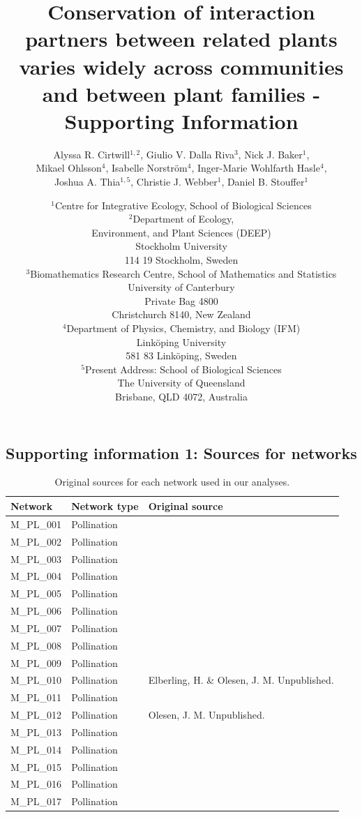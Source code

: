 \documentclass[12pt]{article}
\title{Conservation of interaction partners between related plants varies widely across communities and between plant families - Supporting Information}
\author{Alyssa R. Cirtwill$^{1,2}$, Giulio V. Dalla Riva$^{3}$, Nick J. Baker$^{1}$,\\
Mikael Ohlsson$^{4}$, Isabelle Norstr\"{o}m$^{4}$, Inger-Marie Wohlfarth Hasle$^{4}$,\\
Joshua A. Thia$^{1,5}$, Christie J. Webber$^{1}$, Daniel B. Stouffer$^{1}$}
\date{\small$^1$Centre for Integrative Ecology, School of Biological Sciences\\
\medskip$^2$Department of Ecology,\\
Environment, and Plant Sciences (DEEP)\\
Stockholm University\\
114 19 Stockholm, Sweden\\
\medskip$^3$Biomathematics Research Centre, School of Mathematics and Statistics\\
University of Canterbury\\Private Bag 4800\\
Christchurch 8140, New Zealand\\
\medskip$^4$Department of Physics, Chemistry, and Biology (IFM)\\ Link\"{o}ping University\\ 581 83 Link\"{o}ping, Sweden\\
\medskip$^5$Present Address: School of Biological Sciences\\
The University of Queensland\\Brisbane, QLD 4072, Australia }
\newcommand{\beginsupplement}{%
        \setcounter{table}{0}
        \renewcommand{\thetable}{S\arabic{table}}%
        \setcounter{figure}{0}
        \renewcommand{\thefigure}{S\arabic{figure}}%
     }
\begin{document}
\maketitle
\baselineskip=8.5mm
\begin{spacing}{1.5}

\linenumbers
\beginsupplement
\clearpage

\section*{Supporting information 1: Sources for networks}
  \begin{table}[!h]
    \caption{Original sources for each network used in our analyses.}
    \label{sources}
    \begin{center}
    \begin{tabular}{|l l m{10cm} |}
    \hline
    Network & Network type & Original source \\
    \hline
    M\_PL\_001  & Pollination & \citep{Arroyo1982}  \\
    M\_PL\_002  & Pollination & \citep{Arroyo1982}  \\
    M\_PL\_003  & Pollination & \citep{Arroyo1982}  \\
    M\_PL\_004  & Pollination & \citep{Barrett1987} \\
    M\_PL\_005  & Pollination & \citep{Clements1923}  \\
    M\_PL\_006  & Pollination & \citep{Dicks2002} \\
    M\_PL\_007  & Pollination & \citep{Dicks2002} \\
    M\_PL\_008  & Pollination & \citep{Dupont2003}  \\
    M\_PL\_009  & Pollination & \citep{Elberling1999} \\
    M\_PL\_010  & Pollination & Elberling, H. \& Olesen, J. M. Unpublished. \\
    M\_PL\_011  & Pollination & \citep{Olesen2002a}  \\
    M\_PL\_012  & Pollination & Olesen, J. M. Unpublished.  \\
    M\_PL\_013  & Pollination & \citep{Ollerton2003}  \\
    M\_PL\_014  & Pollination & \citep{Hocking1968} \\
    M\_PL\_015  & Pollination & \citep{Petanidou1991} \\
    M\_PL\_016  & Pollination & \citep{Herrera1988} \\
    M\_PL\_017  & Pollination & \citep{Memmott2002} \\

\end{tabular}
\end{center}
\end{table}
\end{spacing}
\end{document}
